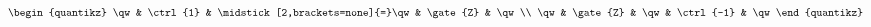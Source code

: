\documentclass[12pt]{article}
\begin{document}
$$
\begin{quantikz}
  \qw & \ctrl{1} & \midstick[2,brackets=none]{=}\qw &
  \gate{Z} & \qw \\
  \qw & \gate{Z} & \qw &
  \ctrl{-1} & \qw
\end{quantikz}
$$
\end{document}
